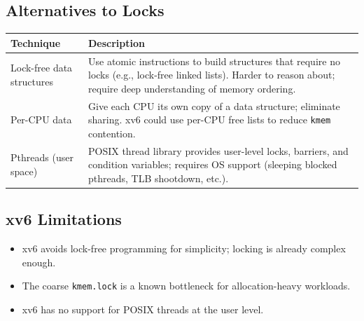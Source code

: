 \documentclass[11pt, a4paper]{article}
\begin{document}
\subsection{Alternatives to Locks}

\begin{center}
\renewcommand{\arraystretch}{1.3}
\begin{tabular}{@{}lp{9cm}@{}}
\toprule
\textbf{Technique} & \textbf{Description} \\
\midrule
Lock-free data structures & Use atomic instructions to build structures that require no locks (e.g., lock-free linked lists). Harder to reason about; require deep understanding of memory ordering. \\
Per-CPU data & Give each CPU its own copy of a data structure; eliminate sharing. xv6 could use per-CPU free lists to reduce \lstinline|kmem| contention. \\
Pthreads (user space) & POSIX thread library provides user-level locks, barriers, and condition variables; requires OS support (sleeping blocked pthreads, TLB shootdown, etc.). \\
\bottomrule
\end{tabular}
\end{center}

\subsection{xv6 Limitations}

\begin{itemize}[leftmargin=1.5em]
  \item xv6 avoids lock-free programming for simplicity; locking is already complex enough.
  \item The coarse \lstinline|kmem.lock| is a known bottleneck for allocation-heavy workloads.
  \item xv6 has no support for POSIX threads at the user level.
\end{itemize}
\end{document}
